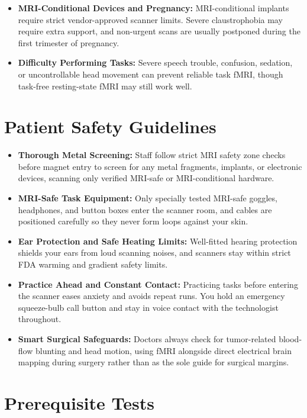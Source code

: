 \begin{itemize}
    \item \textbf{MRI-Conditional Devices and Pregnancy:} MRI-conditional implants require strict vendor-approved scanner limits. Severe claustrophobia may require extra support, and non-urgent scans are usually postponed during the first trimester of pregnancy.
    \item \textbf{Difficulty Performing Tasks:} Severe speech trouble, confusion, sedation, or uncontrollable head movement can prevent reliable task fMRI, though task-free resting-state fMRI may still work well.
\end{itemize}

\section{Patient Safety Guidelines}

\begin{itemize}
    \item \textbf{Thorough Metal Screening:} Staff follow strict MRI safety zone checks before magnet entry to screen for any metal fragments, implants, or electronic devices, scanning only verified MRI-safe or MRI-conditional hardware.
    \item \textbf{MRI-Safe Task Equipment:} Only specially tested MRI-safe goggles, headphones, and button boxes enter the scanner room, and cables are positioned carefully so they never form loops against your skin.
    \item \textbf{Ear Protection and Safe Heating Limits:} Well-fitted hearing protection shields your ears from loud scanning noises, and scanners stay within strict FDA warming and gradient safety limits.
    \item \textbf{Practice Ahead and Constant Contact:} Practicing tasks before entering the scanner eases anxiety and avoids repeat runs. You hold an emergency squeeze-bulb call button and stay in voice contact with the technologist throughout.
    \item \textbf{Smart Surgical Safeguards:} Doctors always check for tumor-related blood-flow blunting and head motion, using fMRI alongside direct electrical brain mapping during surgery rather than as the sole guide for surgical margins.
\end{itemize}

\section{Prerequisite Tests}

